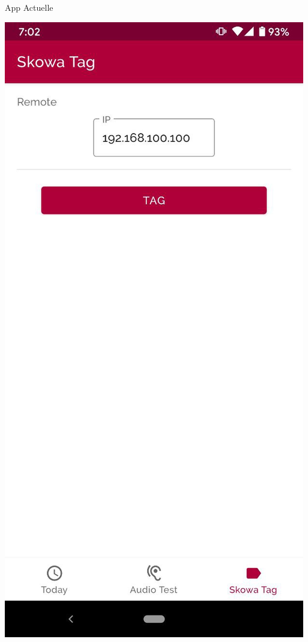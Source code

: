 \documentclass[aspectratio=169]{beamer}
\begin{document}
\begin{frame}{App Actuelle}
\begin{minipage}{.3\textwidth}
  \end{minipage}%
  \begin{minipage}{.3\textwidth}
    \centering
    \includegraphics[height=.8\textheight]{../assets/android2}
  \end{minipage}

\end{frame}
\end{document}
